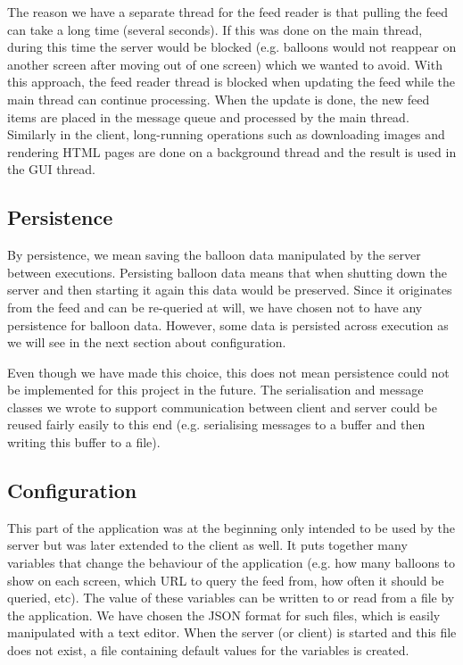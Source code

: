 The reason we have a separate thread for the feed reader is that pulling the 
feed can take a long time (several seconds). If this was done on the main 
thread, during this time the server would be blocked (e.g. balloons would not 
reappear on another screen after moving out of one screen) which we wanted to 
avoid. With this approach, the feed reader thread is blocked when updating the
feed while the main thread can continue processing. When the update is done, the
new feed items are placed in the message queue and processed by the main thread.
Similarly in the client, long-running operations such as downloading images and 
rendering HTML pages are done on a background thread and the result is used in 
the GUI thread.

\clearpage{}
\subsection{Persistence}

By persistence, we mean saving the balloon data manipulated by the server between 
executions. Persisting balloon data means that when shutting down the 
server and then starting it again this data would be preserved. Since it 
originates from the feed and can be re-queried at will, we have chosen not to
have any persistence for balloon data. However, some data is persisted across 
execution as we will see in the next section about configuration.

Even though we have made this choice, this does not mean persistence could not 
be implemented for this project in the future. The serialisation and message 
classes we wrote to support communication between client and server could be 
reused fairly easily to this end (e.g. serialising messages to a buffer and 
then writing this buffer to a file).

\subsection{Configuration}

This part of the application was at the beginning only intended to be used by 
the server but was later extended to the client as well. It puts together many 
variables that change the behaviour of the application (e.g. how many balloons 
to show on each screen, which URL to query the feed from, how often it  
should be queried, etc). The value of these variables can be written to or read 
from a file by the application. We have chosen the JSON format for such files, 
which is easily manipulated with a text editor. When the server (or client) is 
started and this file does not exist, a file containing default values for the 
variables is created.

